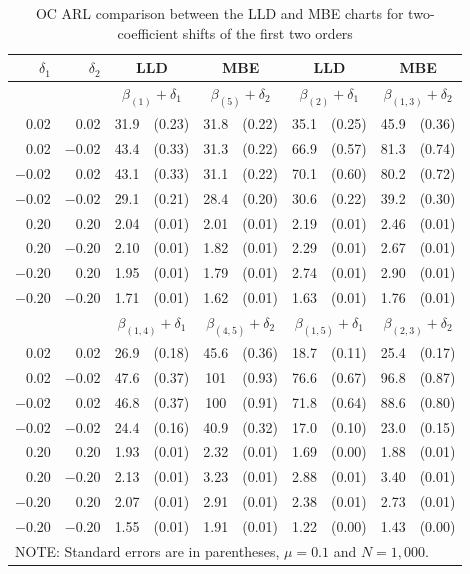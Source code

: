 \begin{table}[!ht]
\tabcolsep 7.7pt  \centering \caption{OC ARL comparison between the LLD and MBE
charts for two-coefficient shifts of the first two orders} \vspace{0.3cm}
\renewcommand{\arraystretch}{1.25}
\begin{tabular}{rr|cccc|cccc}\hline
$\delta_1$ & $\delta_2$ & \multicolumn{2}{c}{LLD} & \multicolumn{2}{c|}{MBE} &
\multicolumn{2}{c}{LLD} & \multicolumn{2}{c}{MBE}
\\\hline
& & \multicolumn{2}{c}{$\beta_{(1)}+\delta_1$} &
\multicolumn{2}{c|}{$\beta_{(5)}+\delta_2$} &
\multicolumn{2}{c}{$\beta_{(2)}+\delta_1$} &
\multicolumn{2}{c}{$\beta_{(1,3)}+\delta_2$}
\\\hline
0.02 & 0.02 & 31.9 & (0.23) & 31.8 & (0.22) & 35.1 & (0.25) & 45.9 & (0.36)
\\
0.02 & $-0.02$ & 43.4 & (0.33) & 31.3 & (0.22) & 66.9 & (0.57) & 81.3 & (0.74)
\\
$-0.02$ & 0.02 & 43.1 & (0.33) & 31.1 & (0.22) & 70.1 & (0.60) & 80.2 & (0.72)
\\
$-0.02$ & $-0.02$ & 29.1 & (0.21) & 28.4 & (0.20) & 30.6 & (0.22) & 39.2 & (0.30)
\\
0.20 & 0.20 & 2.04 & (0.01) & 2.01 & (0.01) & 2.19 & (0.01) & 2.46 & (0.01)
\\
0.20 & $-0.20$ & 2.10 & (0.01) & 1.82 & (0.01) & 2.29 & (0.01) & 2.67 & (0.01)
\\
$-0.20$ & 0.20 & 1.95 & (0.01) & 1.79 & (0.01) & 2.74 & (0.01) & 2.90 & (0.01)
\\
$-0.20$ & $-0.20$ & 1.71 & (0.01) & 1.62 & (0.01) & 1.63 & (0.01) & 1.76 & (0.01)
\\\hline
& & \multicolumn{2}{c}{$\beta_{(1,4)}+\delta_1$} &
\multicolumn{2}{c|}{$\beta_{(4,5)}+\delta_2$} &
\multicolumn{2}{c}{$\beta_{(1,5)}+\delta_1$} &
\multicolumn{2}{c}{$\beta_{(2,3)}+\delta_2$}
\\\hline
0.02 & 0.02 & 26.9 & (0.18) & 45.6 & (0.36) & 18.7 & (0.11) & 25.4 & (0.17)
\\
0.02 & $-0.02$ & 47.6 & (0.37) & 101 & (0.93) & 76.6 & (0.67) & 96.8 & (0.87)
\\
$-0.02$ & 0.02 & 46.8 & (0.37) & 100 & (0.91) & 71.8 & (0.64) & 88.6 & (0.80)
\\
$-0.02$ & $-0.02$ & 24.4 & (0.16) & 40.9 & (0.32) & 17.0 & (0.10) & 23.0 & (0.15)
\\
0.20 & 0.20 & 1.93 & (0.01) & 2.32 & (0.01) & 1.69 & (0.00) & 1.88 & (0.01)
\\
0.20 & $-0.20$ & 2.13 & (0.01) & 3.23 & (0.01) & 2.88 & (0.01) & 3.40 & (0.01)
\\
$-0.20$ & 0.20 & 2.07 & (0.01) & 2.91 & (0.01) & 2.38 & (0.01) & 2.73 & (0.01)
\\
$-0.20$ & $-0.20$ & 1.55 & (0.01) & 1.91 & (0.01) & 1.22 & (0.00) & 1.43 & (0.00)
\\\hline
\multicolumn{10}{l}{NOTE: Standard errors are in parentheses, $\mu=0.1$ and
$N=1,000$.}
\end{tabular}
\end{table}


